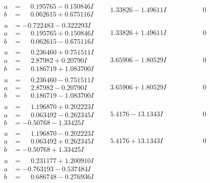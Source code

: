 \documentclass[1p]{elsarticle_modified}
\theoremstyle{definition}
\begin{document}
$$\begin{array}{c|c|c}
\begin{aligned}
a &= \phantom{-}0.195765 - 0.150846 I \\
b &= \phantom{-}0.062615 + 0.675116 I\end{aligned}
 & \phantom{-}1.33826 - 1.49611 I & \phantom{-0.000000 } 0 \\ \hline\begin{aligned}
u &= -0.722483 - 0.322293 I \\
a &= \phantom{-}0.195765 + 0.150846 I \\
b &= \phantom{-}0.062615 - 0.675116 I\end{aligned}
 & \phantom{-}1.33826 + 1.49611 I & \phantom{-0.000000 } 0 \\ \hline\begin{aligned}
u &= \phantom{-}0.236460 + 0.751511 I \\
a &= \phantom{-}2.87982 + 0.20790 I \\
b &= \phantom{-}0.186719 + 1.083700 I\end{aligned}
 & \phantom{-}3.65906 - 1.80529 I & \phantom{-0.000000 } 0 \\ \hline\begin{aligned}
u &= \phantom{-}0.236460 - 0.751511 I \\
a &= \phantom{-}2.87982 - 0.20790 I \\
b &= \phantom{-}0.186719 - 1.083700 I\end{aligned}
 & \phantom{-}3.65906 + 1.80529 I & \phantom{-0.000000 } 0 \\ \hline\begin{aligned}
u &= \phantom{-}1.196870 + 0.202223 I \\
a &= \phantom{-}0.063492 - 0.262345 I \\
b &= -0.50768 - 1.33425 I\end{aligned}
 & \phantom{-}5.4176 - 13.1343 I & \phantom{-0.000000 } 0 \\ \hline\begin{aligned}
u &= \phantom{-}1.196870 - 0.202223 I \\
a &= \phantom{-}0.063492 + 0.262345 I \\
b &= -0.50768 + 1.33425 I\end{aligned}
 & \phantom{-}5.4176 + 13.1343 I & \phantom{-0.000000 } 0 \\ \hline\begin{aligned}
u &= \phantom{-}0.231177 + 1.200910 I \\
a &= -0.763193 - 0.537484 I \\
b &= \phantom{-}0.686748 - 0.276936 I\end{aligned}

\end{array}$$
\end{document}

